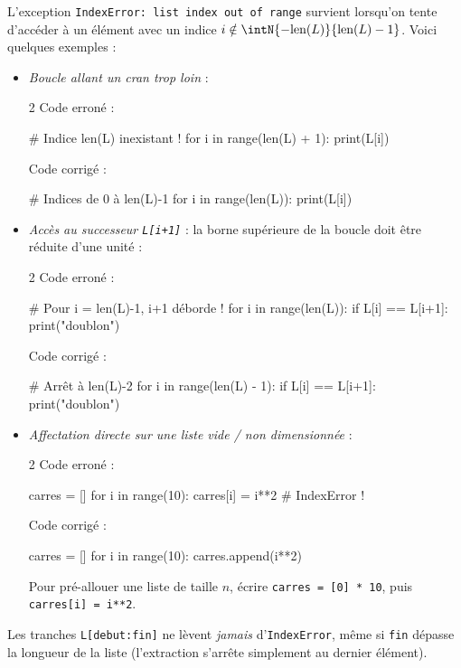 \documentclass[11pt,a4paper]{article}
\begin{document}
\begin{tcolorbox}[left=0cm,title=\bf{\faBug \; 4. Erreurs d'indice (IndexError)},colbacktitle=cfond]
L'exception \texttt{IndexError: list index out of range} survient lorsqu'on tente d'accéder à un élément avec un indice $i \notin \intN{-\text{len}(L)}{\text{len}(L)-1}$. Voici quelques exemples :
\begin{itemize}
	\item[\textbullet] \textit{Boucle allant un cran trop loin} :
	\setlength{\multicolsep}{0pt}
	\begin{multicols}{2}
		\textcolor{BrickRed}{\faTimesCircle \; Code erroné :}
		\begin{python}
# Indice len(L) inexistant !
for i in range(len(L) + 1):
    print(L[i])
		\end{python}
		\textcolor{OliveGreen}{\faCheckCircle \; Code corrigé :}
		\begin{python}
# Indices de 0 à len(L)-1
for i in range(len(L)):
    print(L[i])
		\end{python}
	\end{multicols}

	\item[\textbullet] \textit{Accès au successeur \texttt{L[i+1]}} : la borne supérieure de la boucle doit être réduite d'une unité :
	\begin{multicols}{2}
		\textcolor{BrickRed}{\faTimesCircle \; Code erroné :}
		\begin{python}
# Pour i = len(L)-1, i+1 déborde !
for i in range(len(L)):
    if L[i] == L[i+1]:
        print("doublon")
		\end{python}
		\textcolor{OliveGreen}{\faCheckCircle \; Code corrigé :}
		\begin{python}
# Arrêt à len(L)-2
for i in range(len(L) - 1):
    if L[i] == L[i+1]:
        print("doublon")
		\end{python}
	\end{multicols}

	\item[\textbullet] \textit{Affectation directe sur une liste vide / non dimensionnée} :
	\begin{multicols}{2}
		\textcolor{BrickRed}{\faTimesCircle \; Code erroné :}
		\begin{python}
carres = []
for i in range(10):
    carres[i] = i**2 # IndexError !
		\end{python}
		\textcolor{OliveGreen}{\faCheckCircle \; Code corrigé :}
		\begin{python}
carres = []
for i in range(10):
    carres.append(i**2)
		\end{python}
	\end{multicols}
	{\small \important} Pour pré-allouer une liste de taille $n$, écrire \texttt{carres = [0] * 10}, puis \texttt{carres[i] = i**2}.
	
\end{itemize}
Les tranches \texttt{L[debut:fin]} ne lèvent \textit{jamais} d'\texttt{IndexError}, même si \texttt{fin} dépasse la longueur de la liste (l'extraction s'arrête simplement au dernier élément).
\end{tcolorbox}
\end{document}
